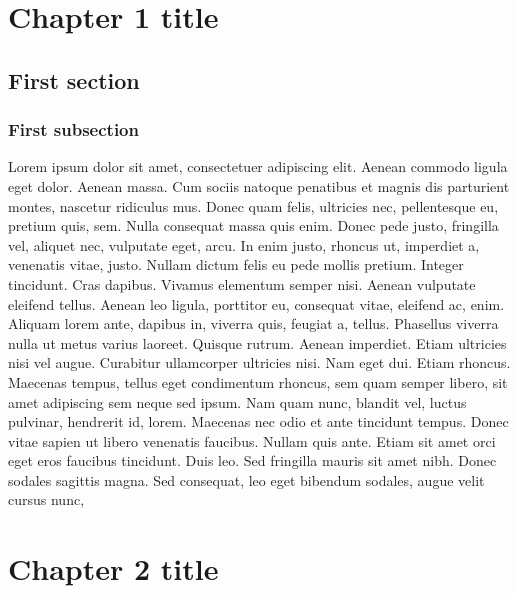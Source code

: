 \documentclass[11pt]{WSU_thesis}
\begin{document}
\chapter{Chapter 1 title}
\section{First section}
\subsection{First subsection}
Lorem ipsum dolor sit amet, consectetuer adipiscing elit\citep{mcgill_variations_1978}. Aenean commodo ligula eget dolor. Aenean massa. Cum sociis natoque penatibus et magnis dis parturient montes, nascetur ridiculus mus. Donec quam felis, ultricies nec, pellentesque eu, pretium quis, sem. Nulla consequat massa quis enim. Donec pede justo, fringilla vel, aliquet nec, vulputate eget, arcu. In enim justo, rhoncus ut, imperdiet a, venenatis vitae, justo. Nullam dictum felis eu pede mollis pretium. Integer tincidunt. Cras dapibus. Vivamus elementum semper nisi. Aenean vulputate eleifend tellus. Aenean leo ligula, porttitor eu, consequat vitae, eleifend ac, enim. Aliquam lorem ante, dapibus in, viverra quis, feugiat a, tellus. Phasellus viverra nulla ut metus varius laoreet. Quisque rutrum. Aenean imperdiet. Etiam ultricies nisi vel augue. Curabitur ullamcorper ultricies nisi. Nam eget dui. Etiam rhoncus. Maecenas tempus, tellus eget condimentum rhoncus, sem quam semper libero, sit amet adipiscing sem neque sed ipsum. Nam quam nunc, blandit vel, luctus pulvinar, hendrerit id, lorem. Maecenas nec odio et ante tincidunt tempus. Donec vitae sapien ut libero venenatis faucibus. Nullam quis ante. Etiam sit amet orci eget eros faucibus tincidunt. Duis leo. Sed fringilla mauris sit amet nibh. Donec sodales sagittis magna. Sed consequat, leo eget bibendum sodales, augue velit cursus nunc,



\chapter{Chapter 2 title}
\end{document}
